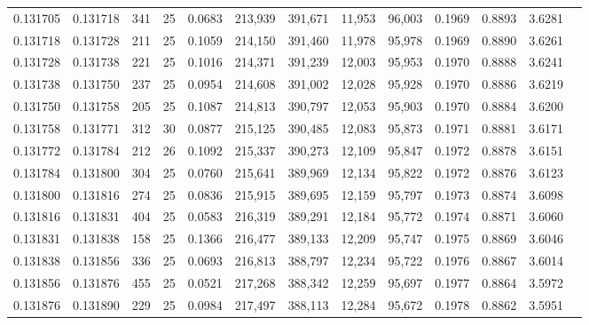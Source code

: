 \begin{tabular}{rrrrrrrrrrrrr}
0.131705 & 0.131718 &   341 &  25 &                                     0.0683 & 213,939 & 391,671 &  11,953 &  96,003 & 0.1969 & 0.8893 & 3.6281 \\
0.131718 & 0.131728 &   211 &  25 &                                     0.1059 & 214,150 & 391,460 &  11,978 &  95,978 & 0.1969 & 0.8890 & 3.6261 \\
0.131728 & 0.131738 &   221 &  25 &                                     0.1016 & 214,371 & 391,239 &  12,003 &  95,953 & 0.1970 & 0.8888 & 3.6241 \\
0.131738 & 0.131750 &   237 &  25 &                                     0.0954 & 214,608 & 391,002 &  12,028 &  95,928 & 0.1970 & 0.8886 & 3.6219 \\
0.131750 & 0.131758 &   205 &  25 &                                     0.1087 & 214,813 & 390,797 &  12,053 &  95,903 & 0.1970 & 0.8884 & 3.6200 \\
0.131758 & 0.131771 &   312 &  30 &                                     0.0877 & 215,125 & 390,485 &  12,083 &  95,873 & 0.1971 & 0.8881 & 3.6171 \\
0.131772 & 0.131784 &   212 &  26 &                                     0.1092 & 215,337 & 390,273 &  12,109 &  95,847 & 0.1972 & 0.8878 & 3.6151 \\
0.131784 & 0.131800 &   304 &  25 &                                     0.0760 & 215,641 & 389,969 &  12,134 &  95,822 & 0.1972 & 0.8876 & 3.6123 \\
0.131800 & 0.131816 &   274 &  25 &                                     0.0836 & 215,915 & 389,695 &  12,159 &  95,797 & 0.1973 & 0.8874 & 3.6098 \\
0.131816 & 0.131831 &   404 &  25 &                                     0.0583 & 216,319 & 389,291 &  12,184 &  95,772 & 0.1974 & 0.8871 & 3.6060 \\
0.131831 & 0.131838 &   158 &  25 &                                     0.1366 & 216,477 & 389,133 &  12,209 &  95,747 & 0.1975 & 0.8869 & 3.6046 \\
0.131838 & 0.131856 &   336 &  25 &                                     0.0693 & 216,813 & 388,797 &  12,234 &  95,722 & 0.1976 & 0.8867 & 3.6014 \\
0.131856 & 0.131876 &   455 &  25 &                                     0.0521 & 217,268 & 388,342 &  12,259 &  95,697 & 0.1977 & 0.8864 & 3.5972 \\
0.131876 & 0.131890 &   229 &  25 &                                     0.0984 & 217,497 & 388,113 &  12,284 &  95,672 & 0.1978 & 0.8862 & 3.5951 \\

\end{tabular}
